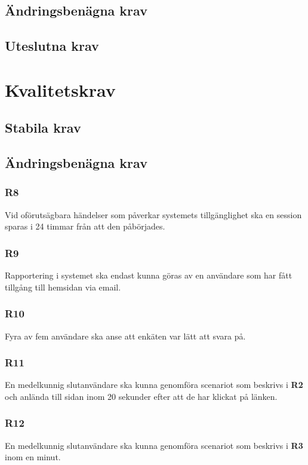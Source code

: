 \documentclass{article}
\begin{document}
    \newpage
    \subsection*{Ändringsbenägna krav}
    \subsection*{Uteslutna krav}
    
  
   
    \section{Kvalitetskrav}
    \subsection*{Stabila krav}
    
  
     \subsection*{Ändringsbenägna krav}
     \subsubsection*{R8}
     Vid oförutsägbara händelser som påverkar systemets tillgänglighet ska en session sparas i 24 timmar från att den påbörjades.
     
    
    \subsubsection*{R9}
    Rapportering i systemet ska endast kunna göras av en användare som har fått tillgång till hemsidan via email.
    
     
    \subsubsection*{R10}
    Fyra av fem användare ska anse att enkäten var lätt att svara på.
    
    \subsubsection*{R11}
    En medelkunnig slutanvändare ska kunna genomföra scenariot som beskrivs i \textbf{R2} och anlända till sidan inom 20 sekunder efter att de har klickat på länken.
    
    \subsubsection*{R12}
    En medelkunnig slutanvändare ska kunna genomföra scenariot som beskrivs i \textbf{R3} inom en minut.
    
\end{document}
